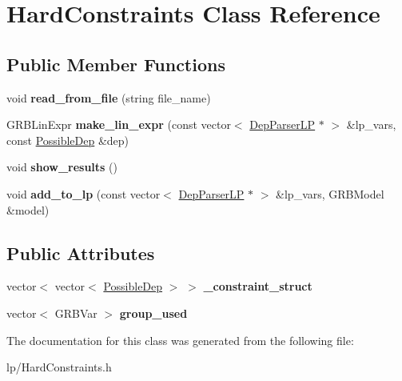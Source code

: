 \hypertarget{classHardConstraints}{
\section{HardConstraints Class Reference}
\label{classHardConstraints}
}
\subsection*{Public Member Functions}
\begin{DoxyCompactItemize}
\item 
\hypertarget{classHardConstraints_ad457a78e966e6ce3d71bfb3401b0300b}{
void {\bfseries read\_\-from\_\-file} (string file\_\-name)}
\label{classHardConstraints_ad457a78e966e6ce3d71bfb3401b0300b}

\item 
\hypertarget{classHardConstraints_a923f4ddd8b164d924147c22f054a9c7e}{
GRBLinExpr {\bfseries make\_\-lin\_\-expr} (const vector$<$ \hyperlink{structScarab_1_1HG_1_1DepParserLP}{DepParserLP} $\ast$ $>$ \&lp\_\-vars, const \hyperlink{structPossibleDep}{PossibleDep} \&dep)}
\label{classHardConstraints_a923f4ddd8b164d924147c22f054a9c7e}

\item 
\hypertarget{classHardConstraints_a0945fb67209be1cc95b31522d96e51cc}{
void {\bfseries show\_\-results} ()}
\label{classHardConstraints_a0945fb67209be1cc95b31522d96e51cc}

\item 
\hypertarget{classHardConstraints_a71ae98e67f5e5d3035aff1c2ef941a92}{
void {\bfseries add\_\-to\_\-lp} (const vector$<$ \hyperlink{structScarab_1_1HG_1_1DepParserLP}{DepParserLP} $\ast$ $>$ \&lp\_\-vars, GRBModel \&model)}
\label{classHardConstraints_a71ae98e67f5e5d3035aff1c2ef941a92}

\end{DoxyCompactItemize}
\subsection*{Public Attributes}
\begin{DoxyCompactItemize}
\item 
\hypertarget{classHardConstraints_ae0305e95d8065eb186ccae220b8e16f4}{
vector$<$ vector$<$ \hyperlink{structPossibleDep}{PossibleDep} $>$ $>$ {\bfseries \_\-constraint\_\-struct}}
\label{classHardConstraints_ae0305e95d8065eb186ccae220b8e16f4}

\item 
\hypertarget{classHardConstraints_a6b370ae5376bf283115092ab4bd33743}{
vector$<$ GRBVar $>$ {\bfseries group\_\-used}}
\label{classHardConstraints_a6b370ae5376bf283115092ab4bd33743}

\end{DoxyCompactItemize}


The documentation for this class was generated from the following file:\begin{DoxyCompactItemize}
\item 
lp/HardConstraints.h\end{DoxyCompactItemize}
